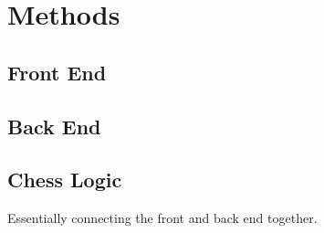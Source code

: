 \chapter{Methods}
\label{chapter2}

\section{Front End}

\section{Back End}

\section{Chess Logic}
Essentially connecting the front and back end together.